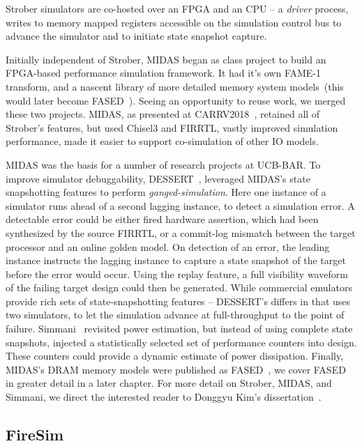 Strober simulators are co-hosted over an FPGA and an CPU -- a \emph{driver}
process, writes to memory mapped registers accessible on the simulation control
bus to advance the simulator and to initiate state snapshot capture.

Initially independent of Strober, MIDAS began as class project to build an
FPGA-based performance simulation framework. It had it's own FAME-1 transform,
and a nascent library of more detailed memory system models~(this would later
become FASED~\cite{FASED}).  Seeing an opportunity to reuse work, we merged
these two projects. MIDAS, as presented at CARRV2018~\cite{MIDAS}, retained all
of Strober's features, but used Chisel3 and FIRRTL, vastly improved simulation
performance, made it easier to support co-simulation of other IO models.

MIDAS was the basis for a number of research projects at UCB-BAR. To improve simulator debuggability, DESSERT~\cite{DESSERT},
leveraged MIDAS's state snapshotting features to perform
\emph{ganged-simulation}. Here one instance of a simulator runs ahead of a second lagging instance, to
detect a simulation error. A detectable error could be either fired hardware assertion, which had been synthesized by the source FIRRTL, or a
commit-log mismatch between the target processor and an online golden model.
On detection of an error, the leading instance instructs the lagging instance to capture a
state snapshot of the target before the error would occur.  Using the replay feature, a
full visibility waveform of the failing target design could then be generated. While
commercial emulators provide rich sets of state-snapshotting features --
DESSERT's differs in that uses two simulators, to let the simulation advance at
full-throughput to the point of failure. Simmani~\cite{Simmani} revisited power
estimation, but instead of using complete state snapshots, injected
a statistically selected set of performance counters into design. These counters
could provide a dynamic estimate of power dissipation. Finally,
MIDAS's DRAM memory models were published as FASED~\cite{FASED}, we cover FASED
in greater detail in a later chapter. For more detail on Strober, MIDAS, and
Simmani, we direct the interested reader to Donggyu Kim's
dissertation~\cite{DGKDissertation}.

\subsection{FireSim}

